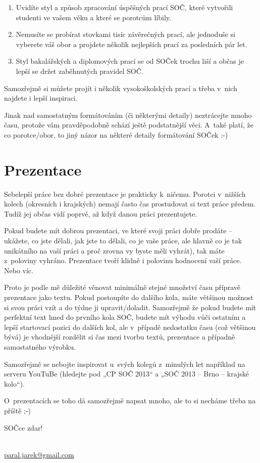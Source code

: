 \begin{enumerate}[label=\alph*)]
	\item Uvidíte styl a způsob zpracování úspěšných prací SOČ, které vytvořili studenti ve vašem věku a které se porotcům líbily.
	\item Nemusíte se probírat stovkami tisíc závěrečných prací, ale jednoduše si vyberete váš obor a projdete několik nejlepších prací za posledních pár let.
	\item Styl bakalářských a diplomových prací se od SOČek trochu liší a občas je lepší se držet zaběhnutých pravidel SOČ.
\end{enumerate}
Samozřejmě si můžete projít i několik vysokoškolských prací a třeba v~nich najdete i lepší inspiraci.

Jinak nad samostatným formátováním (či některými detaily) neztrácejte mnoho času, protože vám pravděpodobně schází ještě podstatnější věci.
A~také platí, že co porotce/obor, to jiný názor na některé detaily formátování SOČek :-)

\section{Prezentace}
Sebelepší práce bez dobré prezentace je prakticky k~ničemu.
Porotci v~nižších kolech (okresních i krajských) nemají často čas prostudovat si text práce předem.
Tudíž jej občas vidí poprvé, až když danou práci prezentujete.

Pokud budete mít dobrou prezentaci, ve které svoji práci dobře prodáte – ukážete, co jste dělali, jak jste to dělali, co je vaše práce, ale hlavně co je tak unikátního na vaší práci a proč zrovna vy byste měli vyhrát), tak máte z~poloviny vyhráno.
Prezentace tvoří klidně i polovinu hodnocení vaší práce.
Nebo víc.

Proto je podle mě důležité věnovat minimálně stejné množství času přípravě prezentace jako textu.
Pokud postoupíte do dalšího kola, máte většinou možnost si svou práci vzít a do týdne ji upravit/doladit.
Samozřejmě že pokud budete mít perfektní text hned do prvního kola SOČ, budete mít výhodu vůči ostatním a lepší startovací pozici do dalších kol, ale v~případě nedostatku času (což většinou bývá) je vhodnější rozdělit si čas mezi tvorbu textů, prezentace a případně samostatného výrobku.

Samozřejmě se nebojte inspirovat u~svých kolegů z~minulých let například na serveru YouTuBe (hledejte pod „CP SOČ 2013“ a „SOČ 2013 – Brno – krajské kolo“).

O~prezentacích se toho dá samozřejmě napsat mnoho, ale to si necháme třeba na příště ;-)

\vspace{\baselineskip}
\noindent SOČce zdar!

\vspace{\baselineskip}
\noindent {}\\
\url{paral.jarek@gmail.com}